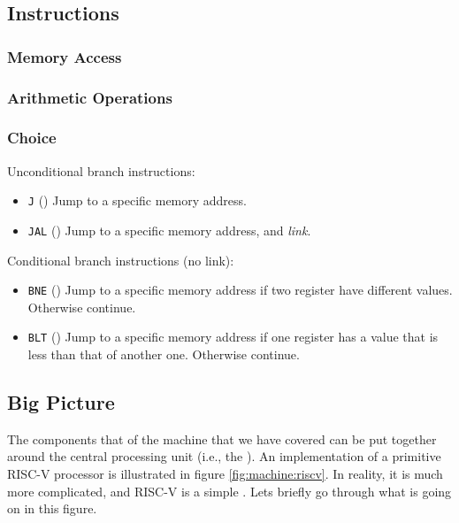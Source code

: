 \subsection{Instructions}

\subsubsection{Memory Access}

\subsubsection{Arithmetic Operations}

\subsubsection{Choice}


Unconditional branch instructions:
\begin{itemize}
  \item \texttt{J} () Jump to a specific memory address.
  \item \texttt{JAL} () Jump to a specific memory address, and \textsl{link}.
\end{itemize}

Conditional branch instructions (no link):
\begin{itemize}
  \item \texttt{BNE} () Jump to a specific memory address if two register have different values. Otherwise continue.
  \item \texttt{BLT} () Jump to a specific memory address if one register has a value that is less than that of another one. Otherwise continue.
\end{itemize}

\subsection{Big Picture}

The components that of the machine that we have covered can be put together around the central processing unit (i.e., the ). An implementation of a primitive RISC-V processor is illustrated in figure \ref{fig:machine:riscv}. In reality, it is much more complicated, and RISC-V is a simple . Lets briefly go through what is going on in this figure.


